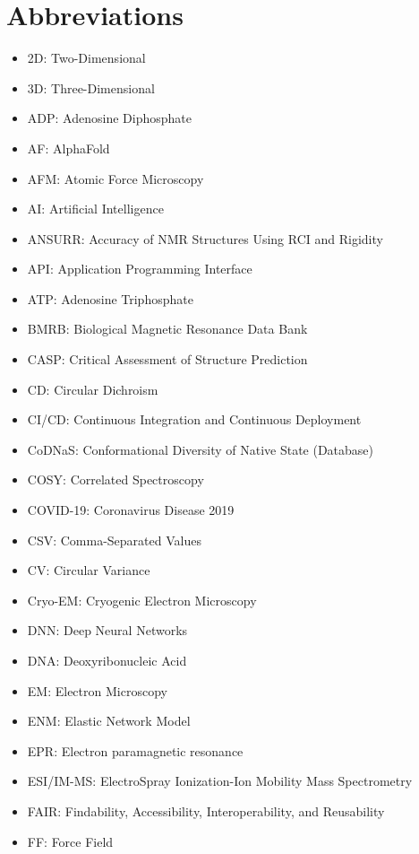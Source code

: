 \chapter*{Abbreviations}

\begin{itemize}
    \item 2D: Two-Dimensional
    \item 3D: Three-Dimensional
    \item ADP: Adenosine Diphosphate
    \item AF: AlphaFold
    \item AFM: Atomic Force Microscopy
    \item AI: Artificial Intelligence
    \item ANSURR: Accuracy of NMR Structures Using RCI and Rigidity
    \item API: Application Programming Interface
    \item ATP: Adenosine Triphosphate
    \item BMRB: Biological Magnetic Resonance Data Bank
    \item CASP: Critical Assessment of Structure Prediction
    \item CD: Circular Dichroism
    \item CI/CD: Continuous Integration and Continuous Deployment
    \item CoDNaS: Conformational Diversity of Native State (Database)
    \item COSY: Correlated Spectroscopy
    \item COVID-19: Coronavirus Disease 2019
    \item CSV: Comma-Separated Values
    \item CV: Circular Variance
    \item Cryo-EM: Cryogenic Electron Microscopy
    \item DNN: Deep Neural Networks
    \item DNA: Deoxyribonucleic Acid
    \item EM: Electron Microscopy
    \item ENM: Elastic Network Model
    \item EPR: Electron paramagnetic resonance
    \item ESI/IM-MS: ElectroSpray Ionization-Ion Mobility Mass Spectrometry
    \item FAIR: Findability, Accessibility, Interoperability, and Reusability
    \item FF: Force Field

\end{itemize}
